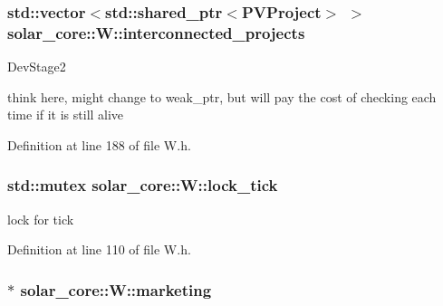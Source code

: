 \hypertarget{classsolar__core_1_1_w_a1d35d6501eef6d673bd2b28e2c1724c4}{}
\subsubsection[{interconnected\+\_\+projects}]{\setlength{\rightskip}{0pt plus 5cm}std\+::vector$<$std\+::shared\+\_\+ptr$<${\bf P\+V\+Project}$>$ $>$ solar\+\_\+core\+::\+W\+::interconnected\+\_\+projects\hspace{0.3cm}{\ttfamily [protected]}}\label{classsolar__core_1_1_w_a1d35d6501eef6d673bd2b28e2c1724c4}
\begin{DoxyRefDesc}{Dev\+Stage2}
\item[\hyperlink{_dev_stage2__DevStage2000030}{Dev\+Stage2}]think here, might change to weak\+\_\+ptr, but will pay the cost of checking each time if it is still alive \end{DoxyRefDesc}


Definition at line 188 of file W.\+h.

\hypertarget{classsolar__core_1_1_w_a56ba20ee51f5db7288e55bb65f12511b}{}
\subsubsection[{lock\+\_\+tick}]{\setlength{\rightskip}{0pt plus 5cm}std\+::mutex solar\+\_\+core\+::\+W\+::lock\+\_\+tick}\label{classsolar__core_1_1_w_a56ba20ee51f5db7288e55bb65f12511b}
lock for tick 

Definition at line 110 of file W.\+h.

\hypertarget{classsolar__core_1_1_w_a93f277fb3a9d9e7b1e911c6a494c8ec8}{}
\subsubsection[{marketing}]{$\ast$ solar\+\_\+core\+::\+W\+::marketing}\label{classsolar__core_1_1_w_a93f277fb3a9d9e7b1e911c6a494c8ec8}


